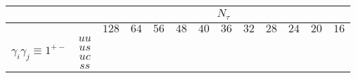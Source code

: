 \documentclass[10pt]{article}
\newcommand{\loq}{{\color[HTML]{006600}{ll}}}
\newcommand{\lon}{{\color[HTML]{800080}{ll}}}
\newcommand{\smn}{{\color[HTML]{800080}{ss}}}
\newcommand{\rcell}{\cellcolor[HTML]{F7CB4A}}
\newcommand{\ocell}{\cellcolor[HTML]{FBAFB5}}
\newcommand{\gcell}{\cellcolor[HTML]{92D2D6}}
\begin{document}
\begin{table}[t]
    \centering
    \Large
    \begin{adjustbox}{max width=\textwidth}
    \begin{tabular}{@{}cc|cc|cc|cc|cc|cc|cc|cc|cc|cc|cc|cc@{}}
        & & \multicolumn{22}{c}{$N_\tau$} \\
        \midrule
        & 
        & \multicolumn{2}{c}{$128$}
        & \multicolumn{2}{c}{$64$} 
        & \multicolumn{2}{c}{$56$} 
        & \multicolumn{2}{c}{$48$} 
        & \multicolumn{2}{c}{$40$} 
        & \multicolumn{2}{c}{$36$} 
        & \multicolumn{2}{c}{$32$} 
        & \multicolumn{2}{c}{$28$} 
        & \multicolumn{2}{c}{$24$} 
        & \multicolumn{2}{c}{$20$} 
        & \multicolumn{2}{c}{$16$} \\

        \multirow{6}{*}{$\gamma_i\gamma_j \equiv 1^{+-}$} 
        & $uu$ 
        & \ocell\loq&\ocell\smn %
        & \ocell\lon&\ocell\smn %
        & \gcell\lon&\gcell\smn %
        & \gcell\loq&\gcell\smn %
        & \ocell\lon&\gcell\smn %
        & \ocell\lon&\gcell\smn %
        & \ocell\lon&\gcell\smn %
        & \ocell\lon&\gcell\smn %
        & \ocell\lon&\gcell\smn %
        & \rcell\lon&\gcell\smn %
        & \rcell\lon&\ocell\smn %
        \\
        & $us$ 
        & \ocell\loq&\ocell\smn %
        & \gcell\lon&\gcell\smn %
        & \gcell\lon&\gcell\smn %
        & \gcell\lon&\gcell\smn %
        & \ocell\lon&\gcell\smn %
        & \ocell\lon&\gcell\smn %
        & \ocell\lon&\gcell\smn %
        & \ocell\lon&\gcell\smn %
        & \ocell\lon&\gcell\smn %
        & \rcell\lon&\gcell\smn %
        & \rcell\lon&\gcell\smn %
        \\
        & $uc$ 
        & \ocell\loq&\ocell\smn %
        & \gcell\lon&\gcell\smn %
        & \ocell\lon&\gcell\smn %
        & \gcell\lon&\ocell\smn %
        & \ocell\lon&\gcell\smn %
        & \ocell\lon&\gcell\smn %
        & \ocell\lon&\gcell\smn %
        & \ocell\lon&\gcell\smn %
        & \ocell\lon&\gcell\smn %
        & \rcell\lon&\ocell\smn %
        & \rcell\lon&\ocell\smn %
        \\
        & $ss$ 
        & \ocell\loq&\ocell\smn %
        & \gcell\lon&\gcell\smn %
        & \ocell\lon&\ocell\smn %
        & \ocell\lon&\ocell\smn %
        & \ocell\lon&\gcell\smn %
        & \ocell\lon&\gcell\smn %

\end{tabular}
\end{adjustbox}
\end{table}
\end{document}
